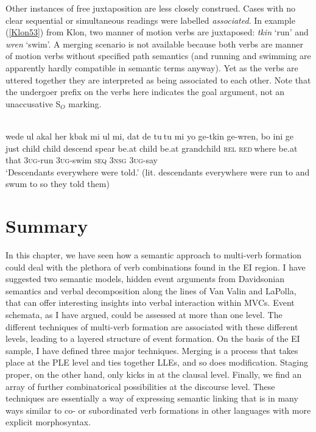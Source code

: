 Other instances of free juxtaposition are less closely construed. Cases with no clear sequential or simultaneous readings were labelled \textit{associated}. In example (\ref{Klon53}) from Klon, two manner of motion verbs are juxtaposed: \textit{tkin} `run' and \textit{wren} `swim'. A merging scenario is not available because both verbs are manner of motion verbs without specified path semantics (and running and swimming are apparently hardly compatible in semantic terms anyway). Yet as the verbs are uttered together they are interpreted as being associated to each other. Note that the undergoer prefix on the verbs here indicates the goal argument, not an unaccusative S$_O$ marking. 

\ea \label{Klon53}
\\
\gll wede ul akal her kbak mi ul mi, dat de tu$~$tu mi yo ge-tkin ge-wren, bo ini ge \\
just child child descend spear be.at child be.at grandchild \textsc{rel} \textsc{red}$~$where be.at that 3\textsc{ug}-run 3\textsc{ug}-swim \textsc{seq} 3\textsc{nsg} 3\textsc{ug}-say \\
\glft `Descendants everywhere were told.' (lit. descendants everywhere were run to and swum to so they told them) \\ 
\z

\section{Summary} \label{sec:sum-sem}

In this chapter, we have seen how a semantic approach to multi-verb formation could deal with the plethora of verb combinations found in the EI region. I have suggested two semantic models, hidden event arguments from Davidsonian semantics and verbal decomposition along the lines of Van Valin and LaPolla, that can offer interesting insights into verbal interaction within MVCs. Event schemata, as I have argued, could be assessed at more than one level. The different techniques of multi-verb formation are associated with these different levels, leading to a layered structure of event formation. On the basis of the EI sample, I have defined three major techniques. Merging is a process that takes place at the PLE level and ties together LLEs, and so does modification. Staging proper, on the other hand, only kicks in at the clausal level. Finally, we find an array of further combinatorical possibilities at the discourse level. These techniques are essentially a way of expressing semantic linking that is in many ways similar to co- or subordinated verb formations in other languages with more explicit morphosyntax.


